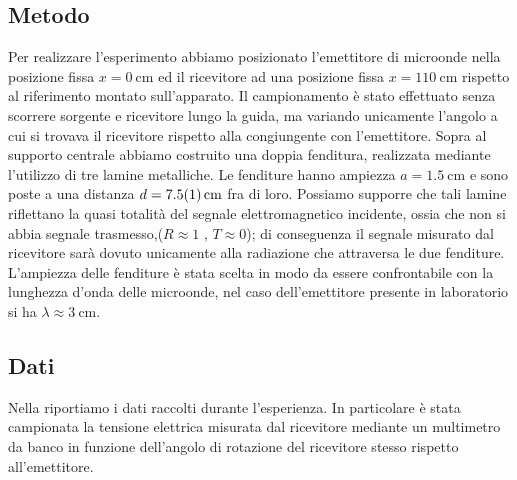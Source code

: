 \documentclass[a4paper]{article}
\begin{document}
\subsection{Metodo}
Per realizzare l'esperimento abbiamo posizionato l'emettitore di microonde nella posizione fissa $x=\SI{0}{\centi\metre}$ ed il ricevitore ad una posizione fissa $x=\SI{110}{\centi\metre}$ rispetto al riferimento montato sull'apparato. Il campionamento è stato effettuato senza scorrere sorgente e ricevitore lungo la guida, ma variando unicamente l'angolo a cui si trovava il ricevitore rispetto alla congiungente con l'emettitore. Sopra al supporto centrale abbiamo costruito una doppia fenditura, realizzata mediante l'utilizzo di tre lamine metalliche. Le fenditure hanno ampiezza $a=\SI{1.5}{\centi\metre}$ e sono poste a una distanza $d=\SI{7.5 \pm 0.1}{\centi\metre}$ fra di loro. Possiamo supporre che tali lamine riflettano la quasi totalità del segnale elettromagnetico incidente, ossia che non si abbia segnale trasmesso,($R\approx1$ , $T\approx0$); di conseguenza il segnale misurato dal ricevitore sarà dovuto unicamente alla radiazione che attraversa le due fenditure. L'ampiezza delle fenditure è stata scelta in modo da essere confrontabile con la lunghezza d'onda delle microonde, nel caso dell'emettitore presente in laboratorio si ha $\lambda \approx \SI{3}{\centi\metre}$.

\subsection{Dati}
Nella  riportiamo i dati raccolti durante l'esperienza. In particolare è stata campionata la tensione elettrica misurata dal ricevitore mediante un multimetro da banco in funzione dell'angolo di rotazione del ricevitore stesso rispetto all'emettitore.
\end{document}
